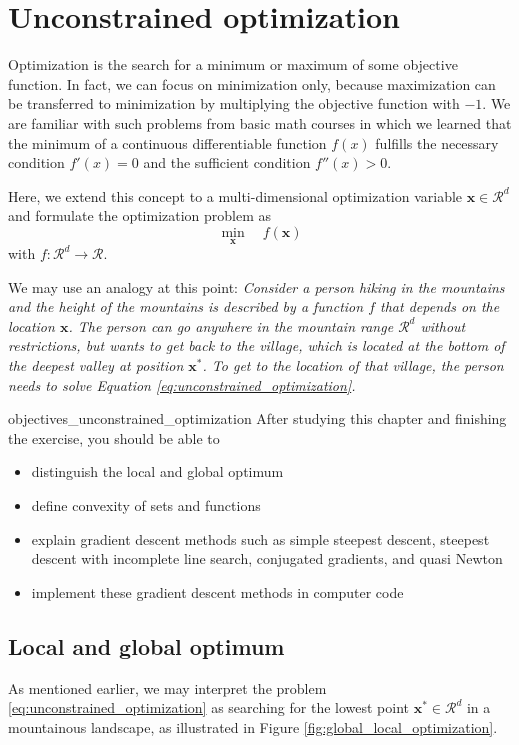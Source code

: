 \chapter{Unconstrained optimization}
Optimization is the search for a minimum or maximum of some objective function. In fact, we can focus on minimization only, because maximization can be transferred to minimization by multiplying the objective function with $-1$. 
We are familiar with such problems from basic math courses in which we learned that the minimum of a continuous differentiable function $f(x)$ fulfills the necessary condition $f'(x)=0$ and the sufficient condition $f''(x) > 0$. 

Here, we extend this concept to a multi-dimensional optimization variable $\mathbf{x} \in \mathcal{R}^d$ and formulate the optimization problem as 
\begin{equation}
    \min_{\mathbf{x}} \quad f(\mathbf{x})
   \label{eq:unconstrained_optimization}
\end{equation}
with $f: \mathcal{R}^d \rightarrow \mathcal{R}$.

We may use an analogy at this point: \emph{Consider a person hiking in the mountains and the height of the mountains is described by a function $f$ that depends on the location $\mathbf{x}$. The person can go anywhere in the mountain range $\mathcal{R}^d$ without restrictions, but wants to get back to the village, which is located at the bottom of the deepest valley at position $\mathbf{x}^*$. To get to the location of that village, the person needs to solve Equation \eqref{eq:unconstrained_optimization}.}

\begin{objectives}{}{objectives_unconstrained_optimization}
After studying this chapter and finishing the exercise, you should be able to 
\begin{itemize}[label=$\dots$]
    \item distinguish the local and global optimum
    \item define convexity of sets and functions
    \item explain gradient descent methods such as simple steepest descent, steepest descent with incomplete line search, conjugated gradients, and quasi Newton 
    \item implement these gradient descent methods in computer code
\end{itemize}
\end{objectives}

\section{Local and global optimum}
As mentioned earlier, we may interpret the problem \eqref{eq:unconstrained_optimization} as searching for the lowest point $\mathbf{x}^* \in \mathcal{R}^d$ in a mountainous landscape, as illustrated in Figure \ref{fig:global_local_optimization}. 

